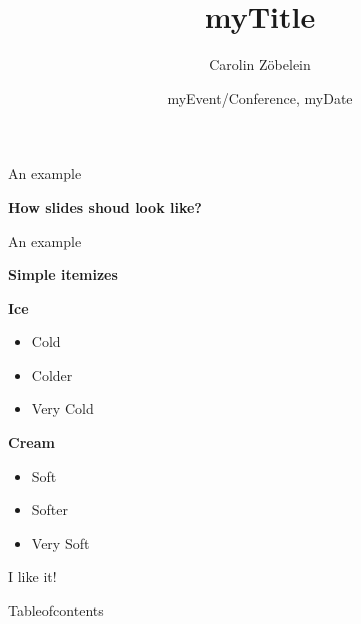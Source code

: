 \documentclass[ucs,10pt]{beamer}
\title[MyTitleShort]{myTitle}
\author[Zöbelein]{Carolin Zöbelein}
\institute[\url{https://research.carolin-zoebelein.de}]{Independent mathematical scientist}
\date[myDate]{myEvent/Conference, myDate}
\begin{document}
\begin{frame}[plain]
  \titlepage
\end{frame}
\begin{frame}{An example}

	\begin{center}
		{\fontsize{12}{12} \selectfont \textbf{How slides shoud look like?}}
	\end{center}	

\end{frame}
\begin{frame}{An example}

	\begin{center}
		{\fontsize{12}{12} \selectfont \textbf{Simple itemizes}}
	\end{center}

	\vspace{0.3cm}
	\begin{center}
		\begin{minipage}[b]{.4\linewidth}
		\begin{center}
			\pause \textbf{Ice}
			\begin{itemize}
				\item Cold
				\item Colder
				\item Very Cold				
			\end{itemize}			
		\end{center}
		\end{minipage}
		\begin{minipage}[b]{.4\linewidth}
		\begin{center}
			\pause \textbf{Cream}
			\begin{itemize}
				\item Soft		
				\item Softer
				\item Very Soft
			\end{itemize}
		\end{center}
		\end{minipage}
	\end{center}

	\vspace{0.3cm}
	\pause\begin{center}I like it!\end{center}

\end{frame}
\begin{frame}{Tableofcontents}
  \tableofcontents %
\end{frame}
\end{document}
